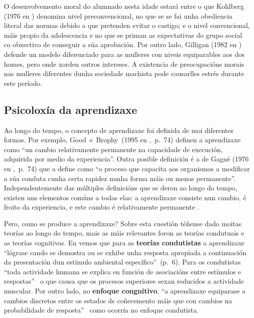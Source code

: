 
O desenvolvemento moral do alumnado nesta idade estará entre o que Kohlberg (1976 en ) denomina nivel preconvencional, no que se se fai unha obediencia literal das normas debido a que pretenden evitar o castigo; e o nivel convencional, máis propio da adolescencia e no que se priman as expectativas do grupo social co obxectivo de conseguir a súa aprobación. Por outro lado, Gilligan (1982 en ) defende un modelo diferenciado para as mulleres con niveis equiparables aos dos homes, pero onde xorden outros intereses. A existencia de preocupacións morais nas mulleres diferentes dunha sociedade machista pode causarlles estrés durante este período.

\subsection{Psicoloxía da aprendizaxe}
Ao longo do tempo, o concepto de aprendizaxe foi definida de moi diferentes formas. Por exemplo, Good~e~Brophy~(1995 en ,~p.~74) definen a aprendizaxe como ``un cambio relativamente permanente na capacidade de execución, adquirida por medio da experiencia''. Outra posible definición é a de Gagné (1976 en ,~p.~74) que a define como ``o proceso que capacita aos organismos a modificar a súa conduta cunha certa rapidez nunha forma máis ou menos permanente''. Independentemente das múltiples definicións que se deron ao longo do tempo, existen uns elementos comúns a todas elas: a aprendizaxe consiste nun cambio, é froito da experiencia, e este cambio é relativamente permanente \cite{unedpsicoedu}.

Pero, como se produce a aprendizaxe? Sobre esta cuestión téñense dado moitas teorías ao longo do tempo, mais as máis relevantes foron as teorías condutuais e as teorías cognitivas. En  vemos que para as \textbf{teorías condutistas} a aprendizaxe ``lógrase cando se demostra ou se exhibe unha resposta apropiada a continuación da presentación dun estímulo ambiental específico''~(p.~6). Para os condutistas ``toda actividade humana se explica en función de asociacións entre estímulos e respostas''~\cite[p.~82]{unedpsicoedu} o que causa que os procesos superiores sexan reducidos a actividade muscular. Por outro lado, no \textbf{enfoque congnitivo}, ``a aprendizaxe equiparase a cambios discretos entre os estados de coñecemento máis que con cambios na probabilidade de resposta''~\cite[p.~9]{ertmer1993conductismo} como ocorría no enfoque condutista.

